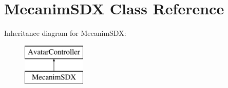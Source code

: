 \hypertarget{class_mecanim_s_d_x}{}\section{Mecanim\+S\+DX Class Reference}
\label{class_mecanim_s_d_x}
Inheritance diagram for Mecanim\+S\+DX\+:\begin{figure}[H]
\begin{center}
\leavevmode
\includegraphics[height=2.000000cm]{d0/dd8/class_mecanim_s_d_x}
\end{center}
\end{figure}
